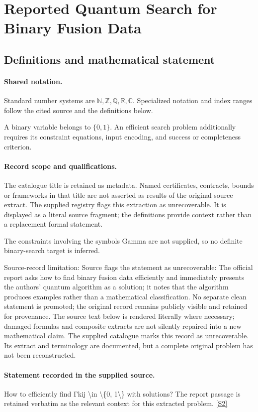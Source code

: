 \documentclass[11pt]{article}
\newcommand{\sref}[2]{\hyperlink{source:#1:#2}{[S#2]}}
\begin{document}
\section{Reported Quantum Search for Binary Fusion Data}\label{statement}

\subsection{Definitions and mathematical statement}

\paragraph{Shared notation.}Standard number systems are $\mathbb N,\mathbb Z,\mathbb Q,\mathbb R,\mathbb C$. Specialized notation and index ranges follow the cited source and the definitions below.


A binary variable belongs to $\{0,1\}$. An efficient search problem additionally requires its constraint equations, input encoding, and success or completeness criterion.
\paragraph{Record scope and qualifications.}
The catalogue title is retained as metadata. Named certificates, contracts, bounds or frameworks in that title are not asserted as results of the original source extract.
The supplied registry flags this extraction as unrecoverable. It is displayed as a literal source fragment; the definitions provide context rather than a replacement formal statement.

The constraints involving the symbols Gamma are not supplied, so no definite binary-search target is inferred.

Source-record limitation: Source flags the statement as unrecoverable: The official report asks how to find binary fusion data efficiently and immediately presents the authors’ quantum algorithm as a solution; it notes that the algorithm produces examples rather than a mathematical classification. No separate clean statement is promoted; the original record remains publicly visible and retained for provenance.
The source text below is rendered literally where necessary; damaged formulas and composite extracts are not silently repaired into a new mathematical claim.
The supplied catalogue marks this record as unrecoverable. Its extract and terminology are documented, but a complete original problem has not been reconstructed.
\paragraph{Statement recorded in the supplied source.}
How to eﬃciently ﬁnd Γkij \textbackslash{}in \textbackslash{}\{0, 1\textbackslash{}\} with solutions? The report passage is retained verbatim as the relevant context for this extracted problem. \sref{statement}{2}
\end{document}

